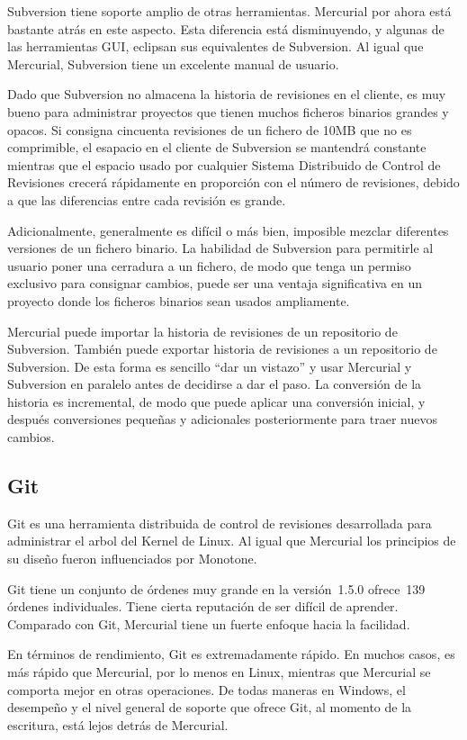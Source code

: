 Subversion tiene soporte amplio de otras herramientas. Mercurial por
ahora está bastante atrás en este aspecto.  Esta diferencia está
disminuyendo, y algunas de las herramientas GUI, eclipsan sus equivalentes de Subversion. Al igual
que Mercurial, Subversion tiene un excelente manual de usuario.

Dado que Subversion no almacena la historia de revisiones en el
cliente, es muy bueno para administrar proyectos que tienen muchos
ficheros binarios grandes y opacos. Si consigna cincuenta revisiones
de un fichero de 10MB que no es comprimible, el esapacio en el cliente
de Subversion se mantendrá constante mientras que el espacio usado por
cualquier Sistema Distribuido de Control de Revisiones crecerá
rápidamente en proporción con el número de revisiones, debido a que
las diferencias entre cada revisión es grande.

Adicionalmente, generalmente es difícil o más bien, imposible mezclar
diferentes versiones de un fichero binario. La habilidad de Subversion
para permitirle al usuario poner una cerradura  a un fichero, de modo
que tenga un permiso exclusivo para consignar cambios, puede ser una
ventaja significativa en un proyecto donde los ficheros binarios sean
usados ampliamente.

Mercurial puede importar la historia de revisiones de un repositorio
de Subversion. También puede exportar historia de revisiones a un
repositorio de Subversion.  De esta forma es sencillo ``dar un
vistazo'' y usar Mercurial y Subversion en paralelo antes de decidirse
a dar el paso. La conversión de la historia es incremental, de modo
que puede aplicar una conversión inicial, y después conversiones
pequeñas y adicionales posteriormente para traer nuevos cambios.

\subsection{Git}

Git es una herramienta distribuida de control de revisiones
desarrollada para administrar el arbol del Kernel de Linux.  Al igual
que Mercurial los principios de su diseño fueron influenciados por 
Monotone.

Git tiene un conjunto de órdenes muy grande en la versión~1.5.0
ofrece~139 órdenes individuales.  Tiene cierta reputación de ser
difícil de aprender. Comparado con Git, Mercurial tiene un fuerte
enfoque hacia la facilidad.

En términos de rendimiento, Git es extremadamente rápido. En muchos
casos, es más rápido que Mercurial, por lo menos en Linux, mientras
que Mercurial se comporta mejor en otras operaciones.  De todas
maneras en Windows, el desempeño y el nivel general de soporte que
ofrece Git, al momento de la escritura, está lejos detrás de
Mercurial.

